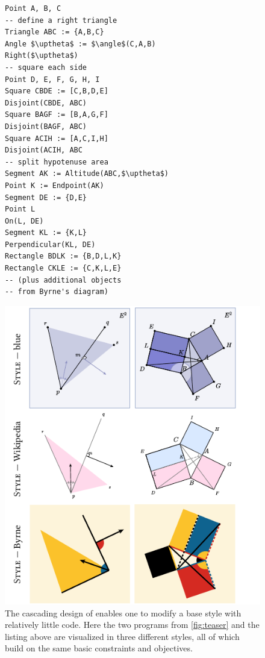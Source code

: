 \begin{figure}
  \centering

  \begin{minipage}[c]{0.41\columnwidth}  
  \begin{mdframed}[style=SUBCode]
  \begin{lstlisting}[language=Sub-geom,escapechar=@,numbers=none]
Point A, B, C
-- define a right triangle
Triangle ABC := {A,B,C}
Angle $\uptheta$ := $\angle$(C,A,B)
Right($\uptheta$)
-- square each side
Point D, E, F, G, H, I
Square CBDE := [C,B,D,E]
Disjoint(CBDE, ABC)
Square BAGF := [B,A,G,F]
Disjoint(BAGF, ABC)
Square ACIH := [A,C,I,H]
Disjoint(ACIH, ABC
-- split hypotenuse area
Segment AK := Altitude(ABC,$\uptheta$)
Point K := Endpoint(AK)
Segment DE := {D,E}
Point L
On(L, DE)
Segment KL := {K,L}
Perpendicular(KL, DE)
Rectangle BDLK := {B,D,L,K}
Rectangle CKLE := {C,K,L,E}
-- (plus additional objects
-- from Byrne's diagram)\end{lstlisting}
\end{mdframed}
\end{minipage}\hfill
\begin{minipage}[c]{.58\columnwidth}
  \includegraphics[width=\linewidth]{assets/penrose/ThreeEuclideanStyles.pdf}
\end{minipage}
   \caption{The cascading design of \Style{} enables one to modify a base style with relatively little code.  Here the two \Substance{} programs from \cref{fig:teaser} and the listing above are visualized in three different styles, all of which build on the same basic constraints and objectives.\label{fig:ThreeEuclideanStyles}}\vspace{-\baselineskip}
\end{figure}

